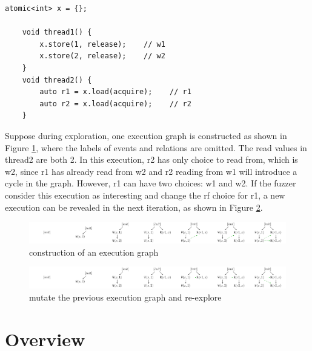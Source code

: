 \begin{lstlisting}[caption={fuzzing example}, label={exp-fuzz}]
    atomic<int> x = {};
    
    void thread1() {
        x.store(1, release);    // w1
        x.store(2, release);    // w2
    }
    void thread2() {
        auto r1 = x.load(acquire);    // r1
        auto r2 = x.load(acquire);    // r2
    }
    \end{lstlisting}



Suppose during exploration, one execution graph is constructed as shown in Figure \ref{example_construct}, where the labels of events and relations are omitted. The read values in thread2 are both 2. In this execution, r2 has only choice to read from, which is w2, since r1 has already read from w2 and r2 reading from w1 will introduce a cycle in the graph. However, r1 can have two choices: w1 and w2. If the fuzzer consider this execution as interesting and change the rf choice for r1, a new execution can be revealed in the next iteration, as shown in Figure \ref{example_mutate}. 

\begin{figure}[htbp] 
    \centering
    \includegraphics[scale=0.5]{figure/exec-graph/example_construct.pdf} 
    \caption{construction of an execution graph} 
    \label{example_construct} 
\end{figure}

\begin{figure}[htbp] 
    \centering
    \includegraphics[scale=0.5]{figure/exec-graph//example_mutate.pdf} 
    \caption{mutate the previous execution graph and re-explore} 
    \label{example_mutate} 
\end{figure}


\section{Overview}




